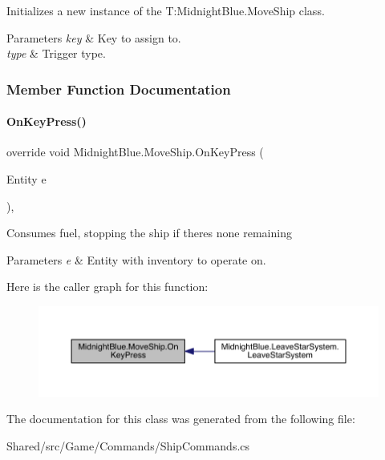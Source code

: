 Initializes a new instance of the T\+:\+Midnight\+Blue.\+Move\+Ship class. 


\begin{DoxyParams}{Parameters}
{\em key} & Key to assign to.\\
\hline
{\em type} & Trigger type.\\
\hline
\end{DoxyParams}


\subsubsection{Member Function Documentation}
\hypertarget{class_midnight_blue_1_1_move_ship_ac4b3dcb62954548f27bad5e5d6a00cdf}{}\label{class_midnight_blue_1_1_move_ship_ac4b3dcb62954548f27bad5e5d6a00cdf} 
\paragraph{\texorpdfstring{On\+Key\+Press()}{OnKeyPress()}}
{\footnotesize\ttfamily override void Midnight\+Blue.\+Move\+Ship.\+On\+Key\+Press (\begin{DoxyParamCaption}\item[{Entity}]{e }\end{DoxyParamCaption})\hspace{0.3cm}{\ttfamily [inline]}, {\ttfamily [protected]}}



Consumes fuel, stopping the ship if there\textquotesingle{}s none remaining 


\begin{DoxyParams}{Parameters}
{\em e} & Entity with inventory to operate on.\\
\hline
\end{DoxyParams}
Here is the caller graph for this function\+:\nopagebreak
\begin{figure}[H]
\begin{center}
\leavevmode
\includegraphics[width=350pt]{class_midnight_blue_1_1_move_ship_ac4b3dcb62954548f27bad5e5d6a00cdf_icgraph}
\end{center}
\end{figure}


The documentation for this class was generated from the following file\+:\begin{DoxyCompactItemize}
\item 
Shared/src/\+Game/\+Commands/Ship\+Commands.\+cs\end{DoxyCompactItemize}
